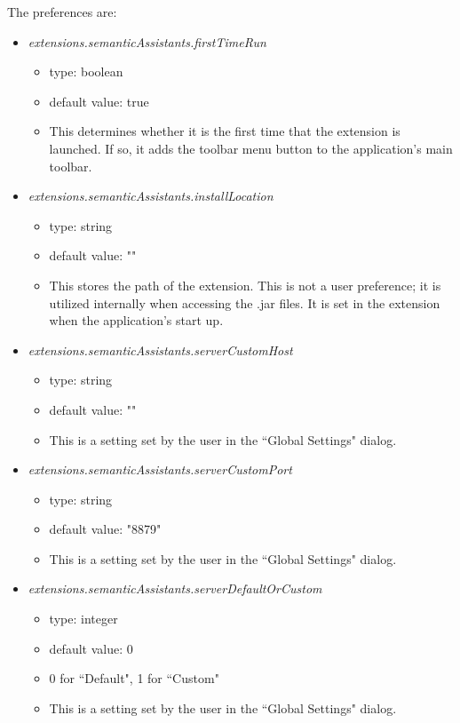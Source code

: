 The preferences are: 

\begin{itemize}
  \item \emph{extensions.semanticAssistants.firstTimeRun} \begin{itemize}
    \item type: boolean
    \item default value: true
    \item This determines whether it is the first time that the extension is launched. If so, it adds the toolbar menu button to the application's main toolbar. 
  \end{itemize}
  \item \emph{extensions.semanticAssistants.installLocation} \begin{itemize}
    \item type: string
    \item default value: ""
    \item This stores the path of the extension. This is not a user preference; it is utilized internally when accessing the .jar files. It is set in the extension when the application's start up. 
  \end{itemize}
  \item \emph{extensions.semanticAssistants.serverCustomHost} \begin{itemize}
    \item type: string
    \item default value: ""
    \item This is a setting set by the user in the ``Global Settings" dialog. 
  \end{itemize}
  \item \emph{extensions.semanticAssistants.serverCustomPort} \begin{itemize}
    \item type: string
    \item default value: "8879"
    \item This is a setting set by the user in the ``Global Settings" dialog. 
  \end{itemize}
  \item \emph{extensions.semanticAssistants.serverDefaultOrCustom} \begin{itemize}
    \item type: integer
    \item default value: 0
    \item 0 for ``Default", 1 for ``Custom"
    \item This is a setting set by the user in the ``Global Settings" dialog. 
  \end{itemize}
\end{itemize}

